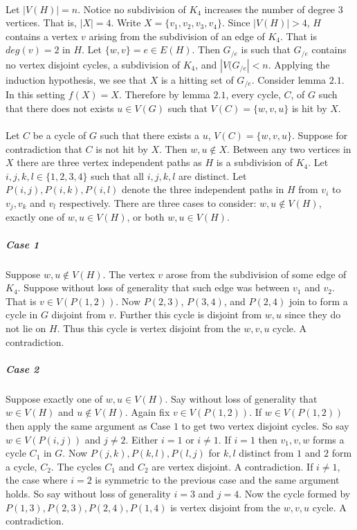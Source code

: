 \documentclass[letterpaper,12pt,oneside,onecolumn]{report}
\begin{document}
\paragraph{}
Let $|V(H)| = n$. Notice no subdivision of $K_4$ increases the number of degree $3$ vertices. That is, $|X| = 4$. Write $X = \{v_1, v_2, v_3, v_4\}$. Since $|V(H)| > 4$, $H$ contains a vertex $v$ arising from the subdivision of an edge of $K_4$. That is $deg(v) = 2$ in $H$. Let $\{w,v\} = e \in E(H)$. Then $G_{/e}$ is such that $G_{/e}$ contains no vertex disjoint cycles, a subdivision of $K_4$, and $|V(G_{/e}| < n$. Applying the induction hypothesis, we see that $X$ is a hitting set of $G_{/e}$. Consider lemma $2.1$. In this setting $f(X) = X$. Therefore by lemma $2.1$, every cycle, $C$, of $G$ such that there does not exists $u \in V(G)$ such that $V(C) = \{w,v,u\}$ is hit by $X$.
\paragraph{}
Let $C$ be a cycle of $G$ such that there exists a $u$, $V(C) = \{w,v,u\}$. Suppose for contradiction that $C$ is not hit by $X$. Then $w, u \not\in X$. Between any two vertices in $X$ there are three vertex independent paths as $H$ is a subdivision of $K_4$. Let $i,j,k,l \in \{1,2,3,4\}$ such that all $i,j,k,l$ are distinct. Let $P(i,j),P(i,k),P(i,l)$ denote the three independent paths in $H$ from $v_i$ to $v_j,v_k$ and $v_l$ respectively. There are three cases to consider: $w, u \not \in V(H)$, exactly one of $w,u \in V(H)$, or both $w,u \in V(H)$.
\subparagraph{Case 1} Suppose $w,u \not\in V(H)$. The vertex $v$ arose from the subdivision of some edge of $K_4$. Suppose without loss of generality that such edge was between $v_1$ and $v_2$. That is $v \in V(P(1,2))$.  Now $P(2,3)$, $P(3,4)$, and $P(2,4)$ join to form a cycle in $G$ disjoint from $v$. Further this cycle is disjoint from $w,u$ since they do not lie on $H$.  Thus this cycle is vertex disjoint from the $w,v,u$ cycle. A contradiction.
\subparagraph{Case 2}
Suppose exactly one of $w,u \in V(H)$. Say without loss of generality that $w \in V(H)$ and $u \not \in V(H)$. Again fix $v \in V(P(1,2))$. If $w \in V(P(1,2))$ then apply the same argument as Case $1$ to get two vertex disjoint cycles. So say $w \in V(P(i,j))$ and $j \neq 2$. Either $i = 1$ or $i \neq 1$. If $i = 1$ then $v_1, v,w$ forms a cycle $C_1$ in $G$. Now $P(j,k),P(k,l),P(l,j)$ for $k,l$ distinct from $1$ and $2$ form a cycle, $C_2$. The cycles $C_1$ and $C_2$ are vertex disjoint. A contradiction. If $i \neq 1$, the case where $i = 2$ is symmetric to the previous case and the same argument holds. So say without loss of generality $i = 3$ and $j = 4$.  Now the cycle formed by $P(1,3),P(2,3),P(2,4),P(1,4)$ is vertex disjoint from the $w,v,u$ cycle. A contradiction.
\end{document}
